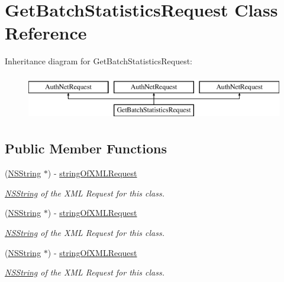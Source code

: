 \hypertarget{interface_get_batch_statistics_request}{
\section{GetBatchStatisticsRequest Class Reference}
\label{interface_get_batch_statistics_request}
}
Inheritance diagram for GetBatchStatisticsRequest:\begin{figure}[H]
\begin{center}
\leavevmode
\includegraphics[height=2.000000cm]{interface_get_batch_statistics_request}
\end{center}
\end{figure}
\subsection*{Public Member Functions}
\begin{DoxyCompactItemize}
\item 
(\hyperlink{class_n_s_string}{NSString} $\ast$) -\/ \hyperlink{interface_get_batch_statistics_request_aa331c611a60cabee121b32e1e2f0b951}{stringOfXMLRequest}
\begin{DoxyCompactList}\small\item\em \hyperlink{class_n_s_string}{NSString} of the XML Request for this class. \item\end{DoxyCompactList}\item 
(\hyperlink{class_n_s_string}{NSString} $\ast$) -\/ \hyperlink{interface_get_batch_statistics_request_aa331c611a60cabee121b32e1e2f0b951}{stringOfXMLRequest}
\begin{DoxyCompactList}\small\item\em \hyperlink{class_n_s_string}{NSString} of the XML Request for this class. \item\end{DoxyCompactList}\item 
(\hyperlink{class_n_s_string}{NSString} $\ast$) -\/ \hyperlink{interface_get_batch_statistics_request_aa331c611a60cabee121b32e1e2f0b951}{stringOfXMLRequest}
\begin{DoxyCompactList}\small\item\em \hyperlink{class_n_s_string}{NSString} of the XML Request for this class. \item\end{DoxyCompactList}\end{DoxyCompactItemize}
